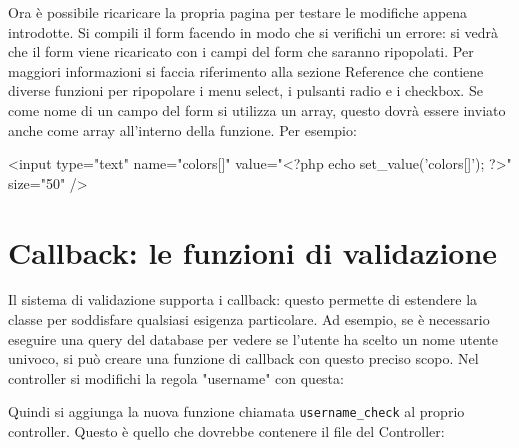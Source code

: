 Ora è possibile ricaricare la propria pagina per testare le modifiche appena introdotte. Si compili il form facendo in modo che si verifichi un errore: si vedrà che il form viene ricaricato con i campi del form che saranno ripopolati. Per maggiori informazioni si faccia riferimento alla sezione Reference che contiene diverse funzioni per ripopolare i menu select, i pulsanti radio e i checkbox. Se come nome di un campo del form si utilizza un array, questo dovrà essere inviato anche come array all'interno della funzione. Per esempio:

\begin{code}
<input type="text" name="colors[]" value="<?php echo set_value('colors[]'); ?>" size="50" />
\end{code}

\section*{Callback: le funzioni di validazione}
Il sistema di validazione supporta i callback: questo permette di estendere la classe per soddisfare qualsiasi esigenza particolare. Ad esempio, se è necessario eseguire una query del database per vedere se l'utente ha scelto un nome utente univoco, si può creare una funzione di callback con questo preciso scopo. Nel controller si modifichi la regola "username" con questa:


Quindi si aggiunga la nuova funzione chiamata \verb|username_check| al proprio controller. Questo è quello che dovrebbe contenere il file del Controller:



